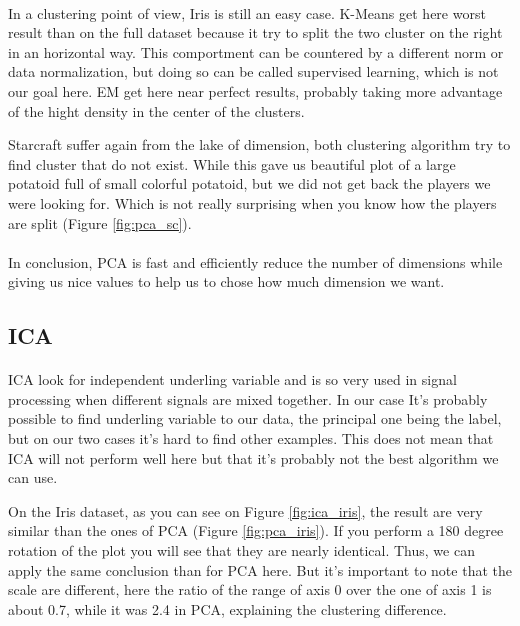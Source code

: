 \documentclass[twocolumn,a4paper,10pt]{article}
\begin{document}
\paragraph{}
In a clustering point of view, Iris is still an easy case. K-Means get here worst result than on the full dataset because it try to split the two cluster on the right in an horizontal way. This comportment can be countered by a different norm or data normalization, but doing so can be called supervised learning, which is not our goal here. EM get here near perfect results, probably taking more advantage of the hight density in the center of the clusters.

Starcraft suffer again from the lake of dimension, both clustering algorithm try to find cluster that do not exist. While this gave us beautiful plot of a large potatoid full of small colorful potatoid, but we did not get back the players we were looking for. Which is not really surprising when you know how the players are split (Figure \ref{fig:pca_sc}).

\paragraph{}
In conclusion, PCA is fast and efficiently reduce the number of dimensions while giving us nice values to help us to chose how much dimension we want.

\subsection{ICA} \label{dr_ica}
\paragraph{}
ICA look for independent underling variable and is so very used in signal processing when different signals are mixed together. In our case It's probably possible to find underling variable to our data, the principal one being the label, but on our two cases it's hard to find other examples. This does not mean that ICA will not perform well here but that it's probably not the best algorithm we can use.

On the Iris dataset, as you can see on Figure \ref{fig:ica_iris}, the result are very similar than the ones of PCA (Figure \ref{fig:pca_iris}). If you perform a 180 degree rotation of the plot you will see that they are nearly identical. Thus, we can apply the same conclusion than for PCA here. But it's important to note that the scale are different, here the ratio of the range of axis 0 over the one of axis 1 is about 0.7, while it was 2.4 in PCA, explaining the clustering difference.
\end{document}

